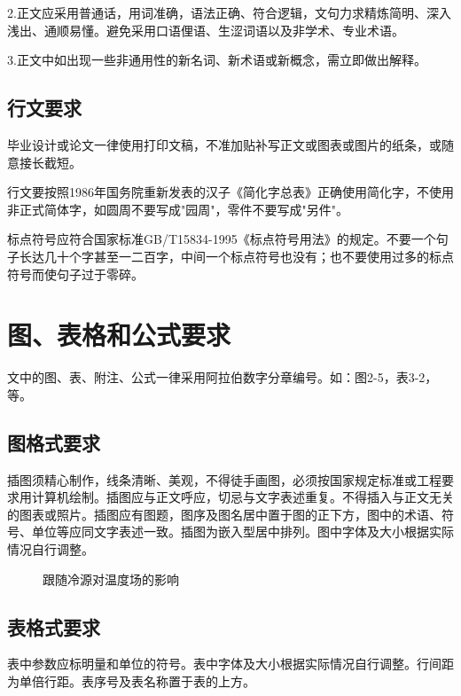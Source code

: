 \documentclass[
	StudentName     = 姓名,
	StudentID       = 学号,
	AdvisorName     = 指导教师,
	Grade           = 年级,
	Major           = 专业,
	Department      = 一个很长很长的名字,
	SubmitYear		= 2022,
	SubmitMonth		= 5,
	Title           = 论文中文题目,
	TitleEng        = {{English Title}}
]{cauc_thesis}
\begin{document}
	2.正文应采用普通话，用词准确，语法正确、符合逻辑，文句力求精炼简明、深入浅出、通顺易懂。避免采用口语俚语、生涩词语以及非学术、专业术语。
	
	3.正文中如出现一些非通用性的新名词、新术语或新概念，需立即做出解释。
	\subsection{行文要求}
	
	毕业设计或论文一律使用打印文稿，不准加贴补写正文或图表或图片的纸条，或随意接长截短。
	
	行文要按照1986年国务院重新发表的汉子《简化字总表》正确使用简化字，不使用非正式简体字，如圆周不要写成"园周"，零件不要写成"另件"。
	
	标点符号应符合国家标准GB/T15834-1995《标点符号用法》的规定。不要一个句子长达几十个字甚至一二百字，中间一个标点符号也没有；也不要使用过多的标点符号而使句子过于零碎。
	
	\section{图、表格和公式要求}
	
	文中的图、表、附注、公式一律采用阿拉伯数字分章编号。如：图2-5，表3-2，等。
	
	\subsection{图格式要求}
	
	插图须精心制作，线条清晰、美观，不得徒手画图，必须按国家规定标准或工程要求用计算机绘制。插图应与正文呼应，切忌与文字表述重复。不得插入与正文无关的图表或照片。插图应有图题，图序及图名居中置于图的正下方，图中的术语、符号、单位等应同文字表述一致。插图为嵌入型居中排列。图中字体及大小根据实际情况自行调整。
	
	\begin{figure}[h]
		\centering
		\hspace{30pt}
		\caption{跟随冷源对温度场的影响}
	\end{figure}
	
	\subsection{表格式要求}
	
	表中参数应标明量和单位的符号。表中字体及大小根据实际情况自行调整。行间距为单倍行距。表序号及表名称置于表的上方。
	
\end{document}

